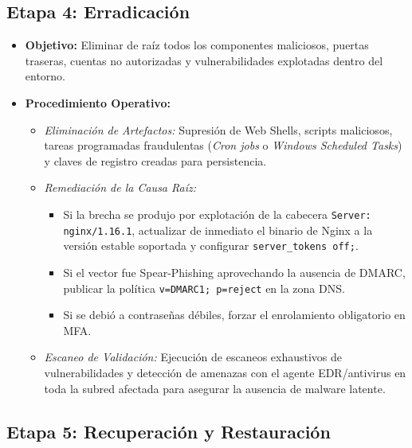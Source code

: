 \subsection{Etapa 4: Erradicación}

\begin{itemize}
    \item \textbf{Objetivo:} Eliminar de raíz todos los componentes maliciosos, puertas traseras, cuentas no autorizadas y vulnerabilidades explotadas dentro del entorno.
    \item \textbf{Procedimiento Operativo:}
    \begin{itemize}
        \item \textit{Eliminación de Artefactos:} Supresión de Web Shells, scripts maliciosos, tareas programadas fraudulentas (\textit{Cron jobs} o \textit{Windows Scheduled Tasks}) y claves de registro creadas para persistencia.
        \item \textit{Remediación de la Causa Raíz:}
        \begin{itemize}
            \item Si la brecha se produjo por explotación de la cabecera \texttt{Server: nginx/1.16.1}, actualizar de inmediato el binario de Nginx a la versión estable soportada y configurar \texttt{server\_tokens off;}.
            \item Si el vector fue Spear-Phishing aprovechando la ausencia de DMARC, publicar la política \texttt{v=DMARC1; p=reject} en la zona DNS.
            \item Si se debió a contraseñas débiles, forzar el enrolamiento obligatorio en MFA.
        \end{itemize}
        \item \textit{Escaneo de Validación:} Ejecución de escaneos exhaustivos de vulnerabilidades y detección de amenazas con el agente EDR/antivirus en toda la subred afectada para asegurar la ausencia de malware latente.
    \end{itemize}
\end{itemize}

\subsection{Etapa 5: Recuperación y Restauración}

